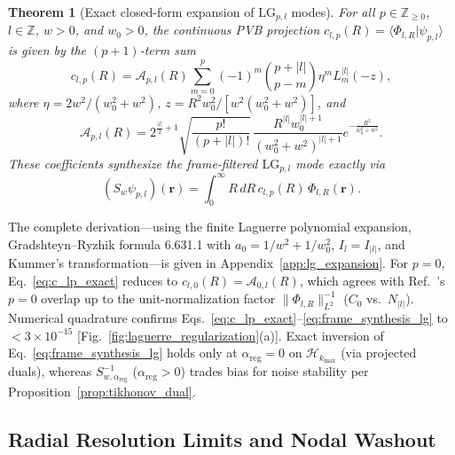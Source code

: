 \documentclass[aps,pra,onecolumn,notitlepage,11pt,tightenlines,amsmath,amssymb,floatfix,longbibliography]{revtex4-2}
\providecommand{\braket}[2]{\langle#1\vert#2\rangle}
\providecommand{\abs}[1]{\lvert#1\rvert}
\providecommand{\norm}[1]{\lVert#1\rVert}
\newtheorem{theorem}{Theorem}
\begin{document}
\begin{theorem}[Exact closed-form expansion of $\mathrm{LG}_{p,l}$ modes]
\label{thm:c_lp_exact}
For all $p \in \mathbb{Z}_{\ge 0}$, $l \in \mathbb{Z}$, $w > 0$, and $w_0 > 0$, the continuous PVB projection $c_{l,p}(R) = \braket{\Phi_{l,R}}{\psi_{p,l}}$ is given by the $(p+1)$-term sum
\begin{equation}
c_{l,p}(R) = \mathcal{A}_{p,l}(R) \sum_{m=0}^p (-1)^m \binom{p+\abs{l}}{p-m} \eta^m L_m^{\abs{l}}(-z),
\label{eq:c_lp_exact}
\end{equation}
where $\eta = 2w^2/(w_0^2 + w^2)$, $z = R^2 w_0^2/[w^2(w_0^2 + w^2)]$, and
\begin{equation}
\mathcal{A}_{p,l}(R) = 2^{\frac{\abs{l}}{2}+1}\sqrt{\frac{p!}{(p+\abs{l})!}}\,\frac{R^{\abs{l}} w_0^{\abs{l}+1}}{(w_0^2 + w^2)^{\abs{l}+1}} e^{-\frac{R^2}{w_0^2 + w^2}}.
\label{eq:A_prefactor}
\end{equation}
These coefficients synthesize the frame-filtered $\mathrm{LG}_{p,l}$ mode exactly via
\begin{equation}
(S_w\psi_{p,l})(\mathbf{r}) = \int_0^\infty R\,dR\, c_{l,p}(R)\,\Phi_{l,R}(\mathbf{r}).
\label{eq:frame_synthesis_lg}
\end{equation}
\end{theorem}

The complete derivation—using the finite Laguerre polynomial expansion, Gradshteyn--Ryzhik formula 6.631.1 with $a_0 = 1/w^2 + 1/w_0^2$, $I_l = I_{\abs{l}}$, and Kummer's transformation—is given in Appendix~\ref{app:lg_expansion}. For $p=0$, Eq.~\eqref{eq:c_lp_exact} reduces to $c_{l,0}(R) = \mathcal{A}_{0,l}(R)$, which agrees with Ref.~\cite{Ferreira2026}'s $p=0$ overlap up to the unit-normalization factor $\norm{\Phi_{l,R}}_{L^2}^{-1}$ ($C_0$ vs.\ $N_{\abs{l}}$). Numerical quadrature confirms Eqs.~\eqref{eq:c_lp_exact}--\eqref{eq:frame_synthesis_lg} to $<3 \times 10^{-15}$ [Fig.~\ref{fig:laguerre_regularization}(a)]. Exact inversion of Eq.~\eqref{eq:frame_synthesis_lg} holds only at $\alpha_{\mathrm{reg}}=0$ on $\mathcal{H}_{k_{\max}}$ (via projected duals), whereas $S_{w,\alpha_{\mathrm{reg}}}^{-1}$ ($\alpha_{\mathrm{reg}} > 0$) trades bias for noise stability per Proposition~\ref{prop:tikhonov_dual}.

\subsection{Radial Resolution Limits and Nodal Washout}
\label{subsec:nodal_washout}
\end{document}
